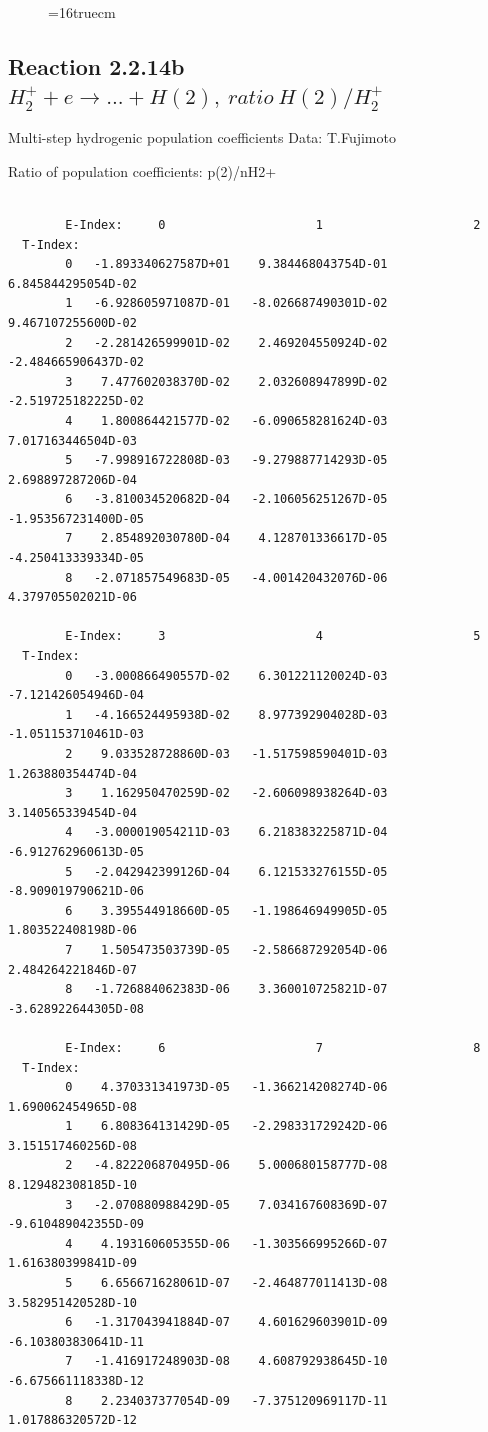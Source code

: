 \documentclass[12pt,dvips]{article}
\begin{document}
\begin{figure} \label{2.2.14a}
\epsfxsize=16truecm
\end{figure}
\newpage

\subsection{
Reaction 2.2.14b $ H_2^+ + e \rightarrow ...+ H(2) , \   ratio ~ H(2)/H_2^+  $
}

 Multi-step hydrogenic population coefficients
 Data: T.Fujimoto

 Ratio of population coefficients: p(2)/nH2+

\begin{small}\begin{verbatim}

        E-Index:     0                     1                     2
  T-Index:
        0   -1.893340627587D+01    9.384468043754D-01    6.845844295054D-02
        1   -6.928605971087D-01   -8.026687490301D-02    9.467107255600D-02
        2   -2.281426599901D-02    2.469204550924D-02   -2.484665906437D-02
        3    7.477602038370D-02    2.032608947899D-02   -2.519725182225D-02
        4    1.800864421577D-02   -6.090658281624D-03    7.017163446504D-03
        5   -7.998916722808D-03   -9.279887714293D-05    2.698897287206D-04
        6   -3.810034520682D-04   -2.106056251267D-05   -1.953567231400D-05
        7    2.854892030780D-04    4.128701336617D-05   -4.250413339334D-05
        8   -2.071857549683D-05   -4.001420432076D-06    4.379705502021D-06

        E-Index:     3                     4                     5
  T-Index:
        0   -3.000866490557D-02    6.301221120024D-03   -7.121426054946D-04
        1   -4.166524495938D-02    8.977392904028D-03   -1.051153710461D-03
        2    9.033528728860D-03   -1.517598590401D-03    1.263880354474D-04
        3    1.162950470259D-02   -2.606098938264D-03    3.140565339454D-04
        4   -3.000019054211D-03    6.218383225871D-04   -6.912762960613D-05
        5   -2.042942399126D-04    6.121533276155D-05   -8.909019790621D-06
        6    3.395544918660D-05   -1.198646949905D-05    1.803522408198D-06
        7    1.505473503739D-05   -2.586687292054D-06    2.484264221846D-07
        8   -1.726884062383D-06    3.360010725821D-07   -3.628922644305D-08

        E-Index:     6                     7                     8
  T-Index:
        0    4.370331341973D-05   -1.366214208274D-06    1.690062454965D-08
        1    6.808364131429D-05   -2.298331729242D-06    3.151517460256D-08
        2   -4.822206870495D-06    5.000680158777D-08    8.129482308185D-10
        3   -2.070880988429D-05    7.034167608369D-07   -9.610489042355D-09
        4    4.193160605355D-06   -1.303566995266D-07    1.616380399841D-09
        5    6.656671628061D-07   -2.464877011413D-08    3.582951420528D-10
        6   -1.317043941884D-07    4.601629603901D-09   -6.103803830641D-11
        7   -1.416917248903D-08    4.608792938645D-10   -6.675661118338D-12
        8    2.234037377054D-09   -7.375120969117D-11    1.017886320572D-12


\end{verbatim}
\end{small}
\end{document}
